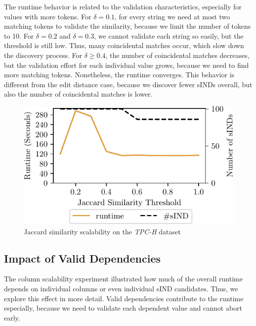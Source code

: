 The runtime behavior is related to the validation characteristics, especially for values with more tokens.
For $\delta = 0.1$, for every string we need at most two matching tokens to validate the similarity, because we limit the number of tokens to 10.
For $\delta = 0.2$ and $\delta = 0.3$, we cannot validate each string so easily, but the threshold is still low.
Thus, many coincidental matches occur, which slow down the discovery process.
For $\delta \geq 0.4$, the number of coincidental matches decreases, but the validation effort for each individual value grows, because we need to find more matching tokens.
Nonetheless, the runtime converges.
This behavior is different from the edit distance case, because we discover fewer sINDs overall, but also the number of coincidental matches is lower.
\begin{figure}[ht]
    \centering
    \includegraphics[width=.55\textwidth]{figures/sim_scaling_TPCH_token.pdf}
    \caption{Jaccard similarity scalability on the \emph{TPC-H} dataset}
    \label{fig:eval:jac_sim_scalability}
\end{figure}

\subsection{Impact of Valid Dependencies}
\label{subsection:evaluation:valid_impact}
The column scalability experiment illustrated how much of the overall runtime depends on individual columns or even individual sIND candidates.
Thus, we explore this effect in more detail.
Valid dependencies contribute to the runtime especially, because we need to validate each dependent value and cannot abort early.

